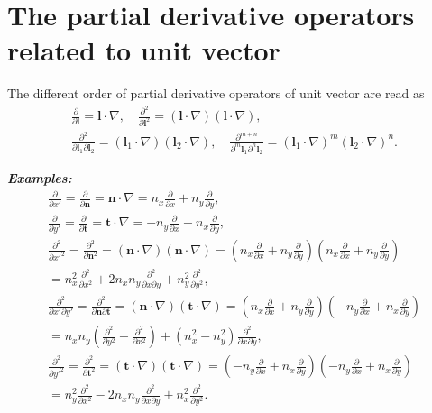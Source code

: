 \documentclass[review]{elsarticle}
\begin{document}
\section{The partial derivative operators related to unit vector}
The different order of partial derivative operators of unit vector are read as
\begin{equation}\label{partlO1}
	\begin{gathered}
		\frac{\partial}{\partial \bm{l}} = \bm{l}\cdot \nabla,\quad 
		\frac{\partial^2}{\partial \bm{l}^2} = \left(\bm{l}\cdot \nabla\right)\left(\bm{l}\cdot \nabla\right),\\
		\frac{\partial^2}{\partial \bm{l}_1\partial \bm{l}_2} = \left(\bm{l}_1\cdot \nabla\right)\left(\bm{l}_2\cdot \nabla\right),\quad 
		\frac{\partial^{m+n}}{\partial^m \bm{l}_1\partial^n \bm{l}_2} = \left(\bm{l}_1\cdot \nabla\right)^m\left(\bm{l}_2\cdot \nabla\right)^n.
	\end{gathered}
\end{equation}

\textit{\textbf{Examples:}}\\
\begin{equation}\label{partialxmyn}
	\begin{gathered}
		\frac{\partial}{\partial x'} = \frac{\partial}{\partial \bm{n}}
			=\bm{n} \cdot \nabla = n_x\frac{\partial}{\partial x}+n_y\frac{\partial}{\partial y},\\
		\frac{\partial}{\partial y'} = \frac{\partial}{\partial \bm{t}}
			=\bm{t} \cdot \nabla = -n_y\frac{\partial}{\partial x}+n_x\frac{\partial}{\partial y},\\
		\frac{\partial^2}{\partial x'^2} = \frac{\partial^2}{\partial\bm{n}^2} 
			=\left(\bm{n} \cdot \nabla\right)\left(\bm{n} \cdot \nabla\right)
			=\left(n_x\frac{\partial}{\partial x}+n_y\frac{\partial}{\partial y}\right)\left(n_x\frac{\partial}{\partial x}+n_y\frac{\partial}{\partial y}\right)\\
			=n_x^2\frac{\partial^2}{\partial x^2}+2n_xn_y\frac{\partial^2}{\partial x\partial y}+n_y^2\frac{\partial^2}{\partial y^2},\\
		\frac{\partial^2}{\partial x'\partial y'} = \frac{\partial^2}{\partial\bm{n}\partial \bm{t}} 
			=\left(\bm{n} \cdot \nabla\right)\left(\bm{t} \cdot \nabla\right)
			=\left(n_x\frac{\partial}{\partial x}+n_y\frac{\partial}{\partial y}\right)\left(-n_y\frac{\partial}{\partial x}+n_x\frac{\partial}{\partial y}\right)\\
			=n_xn_y\left(\frac{\partial^2}{\partial y^2}-\frac{\partial^2}{\partial x^2}\right)+\left(n_x^2-n_y^2\right)\frac{\partial^2}{\partial x\partial y},\\
		\frac{\partial^2}{\partial y'^2} = \frac{\partial^2}{\partial\bm{t}^2} 
			=\left(\bm{t} \cdot \nabla\right)\left(\bm{t} \cdot \nabla\right)
			=\left(-n_y\frac{\partial}{\partial x}+n_x\frac{\partial}{\partial y}\right)\left(-n_y\frac{\partial}{\partial x}+n_x\frac{\partial}{\partial y}\right)\\
			=n_y^2\frac{\partial^2}{\partial x^2}-2n_xn_y\frac{\partial^2}{\partial x\partial y}+n_x^2\frac{\partial^2}{\partial y^2}.
	\end{gathered}
\end{equation}
\end{document}
